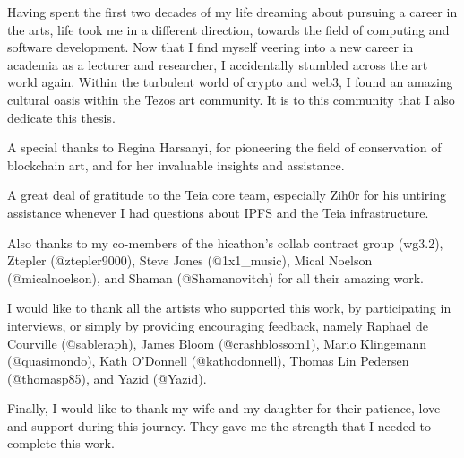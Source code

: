 Having spent the first two decades of my life dreaming about pursuing a career in the arts, life took me in a different direction, towards the field of computing and software development. Now that I find myself veering into a new career in academia as a lecturer and researcher, I accidentally stumbled across the art world again. Within the turbulent world of crypto and web3, I found an amazing cultural oasis within the Tezos art community. It is to this community that I also dedicate this thesis. 

A special thanks to Regina Harsanyi, for pioneering the field of conservation of blockchain art, and for her invaluable insights and assistance.

A great deal of gratitude to the Teia core team, especially Zih0r for his untiring assistance whenever I had questions about IPFS and the Teia infrastructure.

Also thanks to my co-members of the hicathon's collab contract group (wg3.2), Ztepler (@ztepler9000), Steve Jones (@1x1\_music), Mical Noelson (@micalnoelson), and Shaman (@Shamanovitch) for all their amazing work.

I would like to thank all the artists who supported this work, by participating in interviews, or simply by providing encouraging feedback, namely Raphael de Courville (@sableraph), James Bloom (@crashblossom1), 
Mario Klingemann (@quasimondo), Kath O'Donnell (@kathodonnell), Thomas Lin Pedersen (@thomasp85), and Yazid (@Yazid).

Finally, I would like to thank my wife and my daughter for their patience, love and support during this journey. They gave me the strength that I needed to complete this work.


